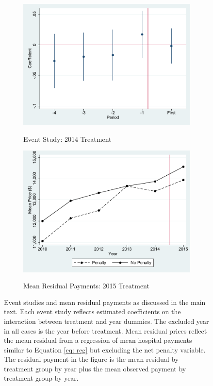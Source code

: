 \documentclass[12pt]{article}
\begin{document}
\begin{figure}[!htb]
\begin{subfigure}{.5\textwidth}
  \label{fig:sfig6}
\end{subfigure}%
\begin{subfigure}{.5\textwidth}
 \caption{Event Study: 2014 Treatment}
  \centering
  \includegraphics[width=.8\linewidth]{ev_lnprice_hcci_2015.pdf}
  \label{fig:sfig7}
\end{subfigure}%
\begin{subfigure}{.5\textwidth}
  \centering
  \caption{Mean Residual Payments: 2015 Treatment}
  \includegraphics[width=.8\linewidth]{price_resid_2015.pdf}
  \label{fig:sfig8}
\end{subfigure}
\caption*{\footnotesize{Event studies and mean residual payments as discussed in the main text. Each event study reflects estimated coefficients on the interaction between treatment and year dummies. The excluded year in all cases is the year before treatment. Mean residual prices reflect the mean residual from a regression of mean hospital payments similar to Equation \ref{eq: reg} but excluding the net penalty variable. The residual payment in the figure is the mean residual by treatment group by year plus the mean observed payment by treatment group by year.}}
\end{figure}
\end{document}

